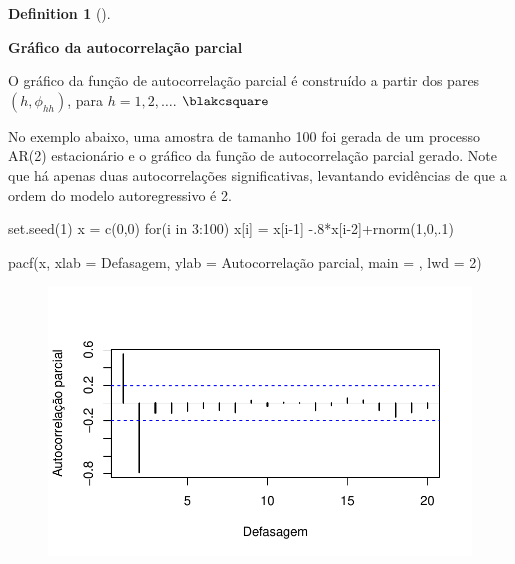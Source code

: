 \documentclass[
  letterpaper,
  DIV=11,
  numbers=noendperiod]{scrartcl}
\newenvironment{Shaded}{\begin{snugshade}}{\end{snugshade}}
\newcommand{\AttributeTok}[1]{\textcolor[rgb]{0.40,0.45,0.13}{#1}}
\newcommand{\ControlFlowTok}[1]{\textcolor[rgb]{0.00,0.23,0.31}{#1}}
\newcommand{\DecValTok}[1]{\textcolor[rgb]{0.68,0.00,0.00}{#1}}
\newcommand{\FunctionTok}[1]{\textcolor[rgb]{0.28,0.35,0.67}{#1}}
\newcommand{\NormalTok}[1]{\textcolor[rgb]{0.00,0.23,0.31}{#1}}
\newcommand{\OtherTok}[1]{\textcolor[rgb]{0.00,0.23,0.31}{#1}}
\newcommand{\SpecialCharTok}[1]{\textcolor[rgb]{0.37,0.37,0.37}{#1}}
\newcommand{\StringTok}[1]{\textcolor[rgb]{0.13,0.47,0.30}{#1}}
\theoremstyle{plain}
\theoremstyle{plain}
\theoremstyle{definition}
\theoremstyle{definition}
\newtheorem{definition}{Definition}[chapter]
\theoremstyle{remark}
\begin{document}
\begin{definition}[]\protect\hypertarget{def-}{}\label{def-}

\textbf{Gráfico da autocorrelação parcial}

O gráfico da função de autocorrelação parcial é construído a partir dos
pares \((h,\phi_{hh})\), para \(h=1,2,\ldots\). \(\blakcsquare\)

\end{definition}

No exemplo abaixo, uma amostra de tamanho 100 foi gerada de um processo
AR(2) estacionário e o gráfico da função de autocorrelação parcial
gerado. Note que há apenas duas autocorrelações significativas,
levantando evidências de que a ordem do modelo autoregressivo é 2.

\begin{Shaded}
\begin{Highlighting}[]
\FunctionTok{set.seed}\NormalTok{(}\DecValTok{1}\NormalTok{)}
\NormalTok{x }\OtherTok{=} \FunctionTok{c}\NormalTok{(}\DecValTok{0}\NormalTok{,}\DecValTok{0}\NormalTok{)}
\ControlFlowTok{for}\NormalTok{(i }\ControlFlowTok{in} \DecValTok{3}\SpecialCharTok{:}\DecValTok{100}\NormalTok{) x[i] }\OtherTok{=}\NormalTok{ x[i}\DecValTok{{-}1}\NormalTok{] }\SpecialCharTok{{-}}\NormalTok{.}\DecValTok{8}\SpecialCharTok{*}\NormalTok{x[i}\DecValTok{{-}2}\NormalTok{]}\SpecialCharTok{+}\FunctionTok{rnorm}\NormalTok{(}\DecValTok{1}\NormalTok{,}\DecValTok{0}\NormalTok{,.}\DecValTok{1}\NormalTok{)}
 
\FunctionTok{pacf}\NormalTok{(x, }\AttributeTok{xlab =} \StringTok{\textquotesingle{}Defasagem\textquotesingle{}}\NormalTok{, }\AttributeTok{ylab =} \StringTok{\textquotesingle{}Autocorrelação parcial\textquotesingle{}}\NormalTok{, }\AttributeTok{main =} \StringTok{\textquotesingle{}\textquotesingle{}}\NormalTok{, }\AttributeTok{lwd =} \DecValTok{2}\NormalTok{)}
\end{Highlighting}
\end{Shaded}

\begin{figure}[H]

{\centering \includegraphics{processo_linear_geral_files/figure-pdf/unnamed-chunk-3-1.pdf}

}

\end{figure}
\end{document}
